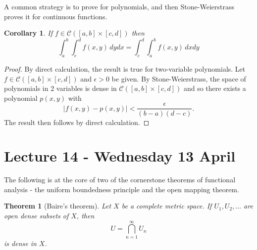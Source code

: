 \documentclass[10pt, oneside, reqno]{amsart}
\theoremstyle{plain}%
\newtheorem{thm}{Theorem}[section]
\newtheorem*{cor}{Corollary}
\theoremstyle{definition}
\theoremstyle{remark}
\begin{document}
A common strategy is to prove for polynomials, and then Stone-Weierstrass proves it for continuous functions.  
\begin{cor}
    If $ f \in \mathcal C([a,b] \times [c,d])$ then \[
        \int_a^b \int_c^d f(x,y) \, dy dx = \int_c^d \int_a^b f(x,y) \, dx dy
    \]
\end{cor}

\begin{proof}
    By direct calculation, the result is true for two-variable polynomials.  Let $f \in \mathcal C([a,b] \times [c,d])$ and $\epsilon > 0$ be given.  By Stone-Weierstrass, the space of polynomials in 2 variables is dense in $\mathcal C([a,b] \times [c,d])$ and so there exists a polynomial $p(x,y)$ with \[
        |f(x,y) - p(x,y)| < \frac{\epsilon}{(b-a)(d-c)}.
    \]  The result then follows by direct calculation.
\end{proof}

\section{Lecture 14 - Wednesday 13 April} %
\label{sec:lecture_14_wednesday_13_april}
The following is at the core of two of the cornerstone theorems of functional analysis - the uniform boundedness principle and the open mapping theorem.

\begin{thm}[Baire's theorem]
    Let $X$ be a complete metric space.  If $U_1, U_2, \dots$ are open dense subsets of $X$, then \[
        U = \bigcap_{n=1}^\infty U_n
    \] is dense in $X$.  
\end{thm}
\end{document}
